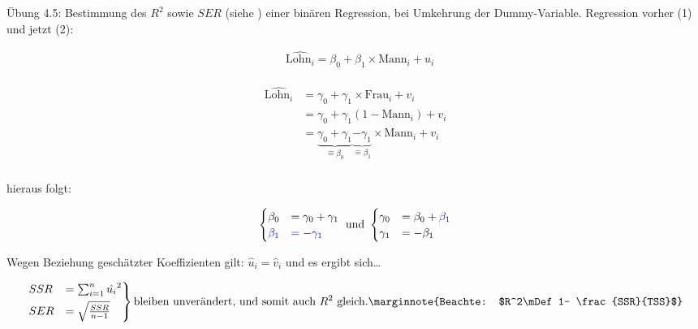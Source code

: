 \setcounter{equation}{0}
Übung 4.5: Bestimmung des $R^2$ sowie $SER$ (siehe )
einer binären Regression, bei Umkehrung der Dummy-Variable. Regression vorher
(1) und jetzt (2):

\begin{align}
	& \widehat{\text{Lohn}_i} = \beta_0 + \beta_1 \times \text{Mann}_i + u_i \label{eq:lohn_mann}
\end{align}

\begin{align}
	\begin{split}
		\widehat{\text{Lohn}_i} &= \gamma_0 + \gamma_1 \times \text{Frau}_i + v_i \label{eq:lohn_frau}\\
		& = \gamma_0 + \gamma_1 (1-\text{Mann}_i) + v_i\\
		& = \underbrace{\gamma_0 + \gamma_1}_{\hat{=}\beta_0} \underbrace{- \gamma_1}_{\hat{=}\beta_1} \times\text{Mann}_i + v_i
	\end{split}
\end{align}\\

hieraus folgt:

\begin{align}
	\begin{cases}
		\beta_{0}&=\gamma_0 + \gamma_1\\
	\textcolor{blue}{\beta_1}&\textcolor{blue}{=-\gamma_1}
	\end{cases}
	\text{~und~}
	\begin{cases}
		\gamma_0&=\beta_0 + \textcolor{blue}{\beta_1}\\
	\gamma_1&= -\beta_1
	\end{cases}
\end{align}

Wegen Beziehung geschätzter Koeffizienten gilt: $\hat{u}_i=\hat{v}_i$
und es ergibt sich\ldots

\begin{align*}
	\begin{rcases}
		SSR&=\sum^{n}_{i=1} \hat{u_i}^2\\
		SER&=\sqrt{\frac{SSR}{n-1}} \\
	\end{rcases}
	\text{bleiben unverändert, und somit auch $R^2$ gleich.}
	\marginnote{Beachte: $R^2\mDef 1- \frac{SSR}{TSS}$}
\end{align*}



